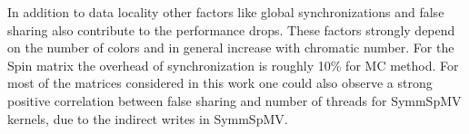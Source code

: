   In addition to data locality other factors like global synchronizations and false sharing also contribute to the performance drops. These factors strongly depend on the number of colors and in general increase with chromatic number. For the Spin matrix the overhead of synchronization is roughly 10\% for \acrshort{MC} method.  For most of the matrices considered in this work one could also observe a strong positive correlation between false sharing and number of threads for \acrshort{SymmSpMV} kernels, due to the indirect writes in \acrshort{SymmSpMV}.
 
 




 

